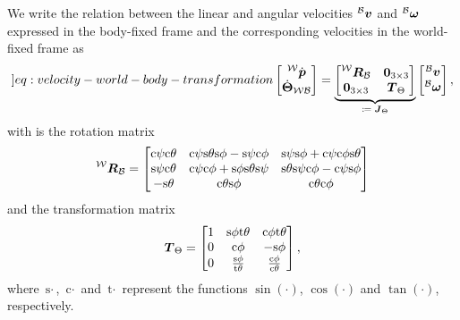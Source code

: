 We write the relation between the linear and angular velocities $\prescript{\mathcal{B}}{}{\mbox{$\bm{v}$}}$ and $\prescript{\mathcal{B}}{}{\mbox{$\bm{\omega}$}}$ expressed in the body-fixed frame and the corresponding velocities in the world-fixed frame as
\begin{equation}
	\label[]{eq:velocity-world-body-transformation}
	\begin{bmatrix}
		\vlinworld \\
		\vangworld
	\end{bmatrix}
	=
	\underbrace{
	\begin{bmatrix}
		\Rbodyworld & \bm{0}_{3 \times 3} \\
		\bm{0}_{3 \times 3} & \TbodyWorld
	\end{bmatrix}
	}_{\mbox{\scriptsize $\coloneqq \Jb_\Theta$}}
	\begin{bmatrix}
		\vlinbody \\
		\vangbody
	\end{bmatrix},
\end{equation}
with is the rotation matrix 
\begin{equation}
	\label{eq:rotation-matrix}
	\Rbodyworld = 
	\begin{bmatrix}
		\text{c}\psi\text{c}\theta
		& \text{c}\psi \text{s}\theta \text{s}\phi - \text{s}\psi \text{c}\phi
		& \text{s}\psi \text{s}\phi + \text{c}\psi \text{c}\phi \text{s} \theta \\
		\text{s}\psi \text{c}\theta
		& \text{c}\psi \text{c}\phi + \text{s}\phi \text{s}\theta \text{s}\psi
		& \text{s}\theta \text{s}\psi \text{c}\phi - \text{c}\psi \text{s}\phi \\
		-\text{s}\theta
		& \text{c}\theta \text{s}\phi
		& \text{c}\theta \text{c}\phi
	\end{bmatrix}
\end{equation}
and the transformation matrix
\begin{equation}
	\label{eq:transformation}
	\mbox{$\bm{T}$}_\Theta = 
	\begin{bmatrix}
		1 & \text{s}\phi \text{t}\theta & \text{c}\phi \text{t}\theta \\
		0 & \text{c}\phi & -\text{s}\phi \\
		0 & \frac{\text{s}\phi}{\text{t}\theta} & \frac{\text{c}\phi}{\text{c}\theta}
	\end{bmatrix},
\end{equation}
where $\text{s}\cdot$, $\text{c}\cdot$ and $\text{t}\cdot$ represent the functions $\sin(\cdot)$, $\cos(\cdot)$ and $\tan(\cdot)$, respectively.

